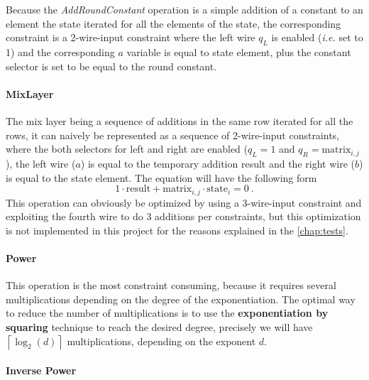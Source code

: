 \documentclass[12pt, a4paper]{report}
\begin{document}
Because the \textit{AddRoundConstant} operation is a simple addition of a constant to an element the state iterated for all the elements of the state, the corresponding constraint is a 2-wire-input constraint where the left wire $q_L$ is enabled (\textsl{i.e.} set to 1) and the corresponding $a$ variable is equal to state element, plus the constant selector is set to be equal to the round constant.

\paragraph{MixLayer}\label{par:mixlayer}

The mix layer being a sequence of additions in the same row iterated for all the rows, it can naively be represented as a sequence of 2-wire-input constraints, where the both selectors for left  and right  are enabled ($q_L = 1$ and $q_R = \text{matrix}_{i,j}$), the left wire ($a$) is equal to the temporary addition result and the right wire ($b$) is equal to the state element.
The equation will have the following form
\begin{equation}
  1 \cdot \text{result} + \text{matrix}_{i,j} \cdot \text{state}_{i} = 0\ .
  \label{eq:}
\end{equation}
This operation can obviously be optimized by using a 3-wire-input constraint and exploiting the fourth wire to do 3 additions per constraints, but this optimization is not implemented in this project for the reasons explained in the \autoref{chap:tests}.

\paragraph{Power}\label{par:power}

This operation is the most constraint consuming, because it requires several multiplications depending on the degree of the exponentiation.
The optimal way to reduce the number of multiplications is to use the \textbf{exponentiation by squaring} technique to reach the desired degree, precisely we will have $\left\lceil \log_2(d) \right\rceil$ multiplications, depending on the exponent $d$.

\paragraph{Inverse Power}
\end{document}
